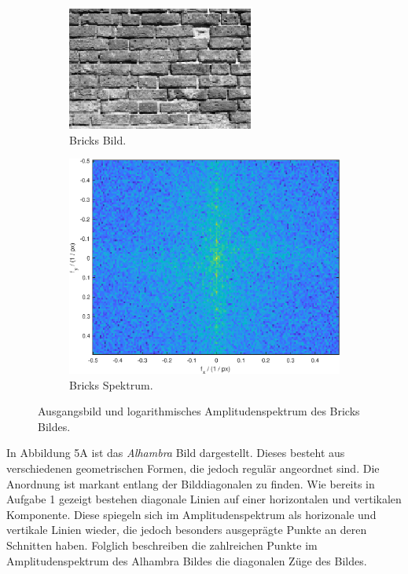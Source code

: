 \begin{figure}[!h]
\centering
\begin{subfigure}[b]{0.45\textwidth}
    \centering
    \includegraphics[width=\textwidth]{ue5/bricks_im.eps}
    \caption{Bricks Bild.}
    \label{fig:bricks_im}
\end{subfigure}
\begin{subfigure}[b]{0.45\textwidth}
    \centering
    \includegraphics[width=.85\textwidth]{ue5/bricks_spec.eps}
    \caption{Bricks Spektrum.}
    \label{fig:bricks_spec}
\end{subfigure}
\label{fig:bricks}
\caption{Ausgangsbild und logarithmisches Amplitudenspektrum des Bricks Bildes.}
\end{figure}

In Abbildung 5A ist das \textit{Alhambra} Bild dargestellt. Dieses besteht aus verschiedenen geometrischen Formen, die jedoch regulär angeordnet sind. Die Anordnung ist markant entlang der Bilddiagonalen zu finden. Wie bereits in Aufgabe 1 gezeigt bestehen diagonale Linien auf einer horizontalen und vertikalen Komponente. Diese spiegeln sich im Amplitudenspektrum als horizonale und vertikale Linien wieder, die jedoch besonders ausgeprägte Punkte an deren Schnitten haben. Folglich beschreiben die zahlreichen Punkte im Amplitudenspektrum des Alhambra Bildes die diagonalen Züge des Bildes.  


